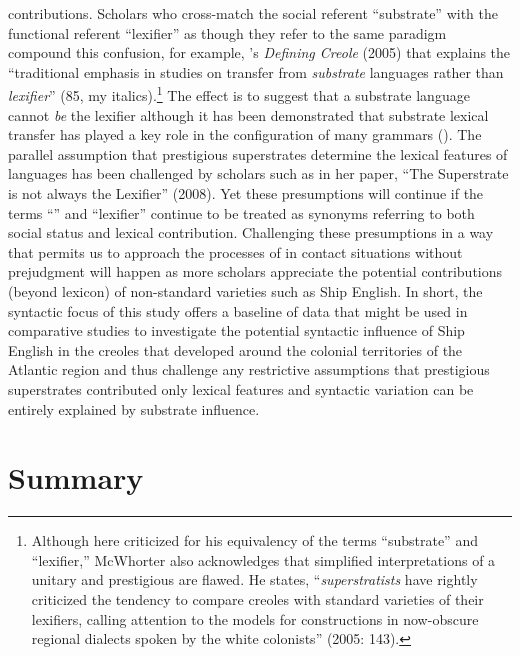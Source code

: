 contributions. Scholars who cross-match the social referent “substrate” with the functional referent “lexifier” as though they refer to the same paradigm compound this confusion, for example, \citeauthor{McWhorter2005}’s \textit{Defining Creole} (2005) that explains the “traditional emphasis in  studies on transfer from \textit{substrate} languages rather than \textit{lexifier}” (85, my italics).\footnote{Although here criticized for his equivalency of the terms “substrate” and “lexifier,” McWhorter also acknowledges that simplified interpretations of a unitary and prestigious  are flawed. He states, “\textit{superstratists} have rightly criticized the tendency to compare creoles with standard varieties of their lexifiers, calling attention to the models for  constructions in now-obscure regional dialects spoken by the white colonists” (2005: 143).}  The effect is to suggest that a substrate language cannot \textit{be} the lexifier although it has been demonstrated that substrate lexical transfer has played a key role in the configuration of many  grammars (\citealt{Kihm1989,Migge1998}). The parallel assumption that prestigious superstrates determine the lexical features of  languages has been challenged by scholars such as \citeauthor{Selbach2008} in her paper, “The Superstrate is not always the Lexifier” (2008). Yet these presumptions will continue if the terms “” and “lexifier” continue to be treated as synonyms referring to both social status and lexical contribution. Challenging these presumptions in a way that permits us to approach the processes of  in contact situations without prejudgment will happen as more scholars appreciate the potential contributions (beyond lexicon) of non-standard varieties such as Ship English. In short, the syntactic focus of this study offers a baseline of data that might be used in comparative studies to investigate the potential syntactic influence of Ship English in the creoles that developed around the colonial territories of the Atlantic region and thus challenge any restrictive assumptions that prestigious superstrates contributed only lexical features and syntactic variation can be entirely explained by substrate influence. 

\section{{Summary}}%

